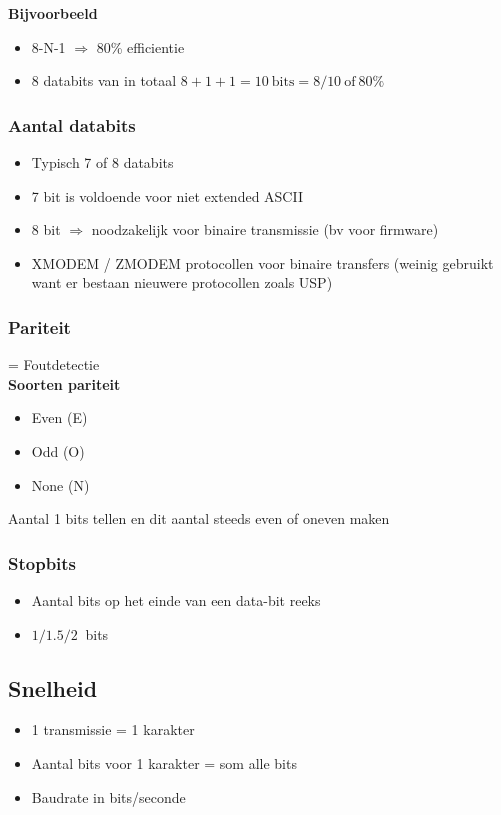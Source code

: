 \documentclass{article}
\newcommand{\bold}[1]{\textbf{#1}}
\begin{document}
\bold{Bijvoorbeeld}
\begin{itemize}
    \item 8-N-1 $\Rightarrow$ 80\% efficientie
    \item 8 databits van in totaal $8+1+1=10\ \text{bits} = 8/10\ \text{of}\ 80\%$
\end{itemize}

\subsubsection{Aantal databits}
\begin{itemize}
    \item Typisch 7 of 8 databits
    \item 7 bit is voldoende voor niet extended ASCII
    \item 8 bit $\Rightarrow$ noodzakelijk voor binaire transmissie (bv voor firmware)
    \item XMODEM / ZMODEM protocollen voor binaire transfers (weinig gebruikt want er bestaan nieuwere protocollen zoals USP)
\end{itemize}

\subsubsection{Pariteit}
= Foutdetectie
\\
\bold{Soorten pariteit}
\begin{itemize}
    \item Even (E)
    \item Odd (O)
    \item None (N)
\end{itemize}

Aantal 1 bits tellen en dit aantal steeds even of oneven maken

\subsubsection{Stopbits}
\begin{itemize}
    \item Aantal bits op het einde van een data-bit reeks
    \item $1/1.5/2\ $ bits
\end{itemize}

\subsection{Snelheid}
\begin{itemize}
    \item 1 transmissie = 1 karakter
    \item Aantal bits voor 1 karakter = som alle bits
    \item Baudrate in bits/seconde
\end{itemize}
\end{document}
